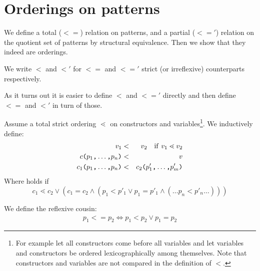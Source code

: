 \section{Orderings on patterns}
\label{sec:orderings-patterns}
We define a total ($<=$) relation on patterns, and a partial ($<='$) relation on
the quotient set of patterns by structural equivalence. Then we show that they
indeed are orderings.

We write $<$ and $<'$ for $<=$ and $<='$ strict (or irreflexive) counterparts
respectively.

As it turns out it is easier to define $<$ and $<='$ directly and then define
$<=$ and $<'$ in turn of those.

\begin{definition}\label{def:pat-total-order-strict}
  Assume a total strict ordering $\lessdot$ on constructors and
  variables\footnote{For example let all constructors come before all variables
    and let variables and constructors be ordered lexicographically among
    themselves. Note that constructors and variables are not compared in the
    definition of $<$.}. We inductively define:
  \begin{eqnarray}
    v_1 &<& v_2 \quad \mathrm{if}\ v_1 \lessdot v_2\label{eq:pat-total-order-strict-var}\\
    c\texttt{(}p_1\texttt{,} \ldots\texttt{,} p_n\texttt{)} &<& v\\
    c_1\texttt{(}p_1\texttt{,} \ldots\texttt{,} p_n\texttt{)} &<&
    c_2\texttt{(}p'_1\texttt{,} \ldots\texttt{,} p'_m\texttt{)}\label{eq:pat-total-order-strict-con}
  \end{eqnarray}
  Where  holds if
  \[
  c_1 \lessdot c_2 \lor (c_1 = c_2 \land ( p_1 < p'_1 \lor p_1 = p'_1 \land (\ldots p_n < p'_n \ldots )))
  \]
\end{definition}

\begin{definition}[Total ordering, $<=$]\label{def:pat-total-order-weak}
  We define the reflexive cousin:
  \begin{eqnarray*}
    p_1 <= p_2 \Longleftrightarrow p_1 < p_2 \lor p_1 = p_2
  \end{eqnarray*}
\end{definition}

